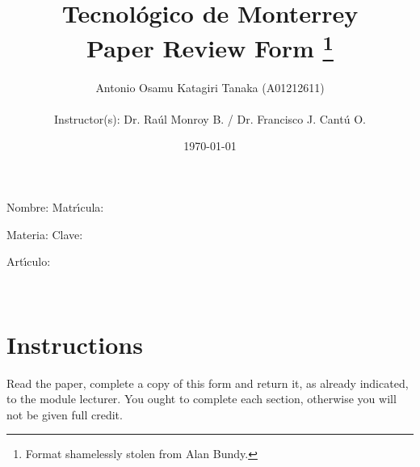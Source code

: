 \documentclass{article}
\title
{
    Tecnol\'ogico de Monterrey\\
    Paper Review Form
    \thanks{Format shamelessly stolen from Alan Bundy.}
}
\author
{    
    Antonio Osamu Katagiri Tanaka (A01212611) \\
    \\
    Instructor(s): Dr. Raúl Monroy B. / Dr. Francisco J. Cantú O.
}
\date{\today}
\begin{document}
\maketitle
\clearpage

\vspace{-2cm}


\begin{description}
\item Nombre:  \hspace{0.30in}
Matr\'{\i}cula: 
\item Materia:  \hspace{0.30in}
Clave: 
\item Art\'{\i}culo:
\begin{mdframed}
\\
\parencite{Barkas2019}
\end{mdframed}
\end{description}


\section*{Instructions} 

{\small Read the paper, complete a copy of this form and return it,
as already indicated, to the module lecturer. You ought to complete each 
section, otherwise you will not be given full credit.}
\end{document}
